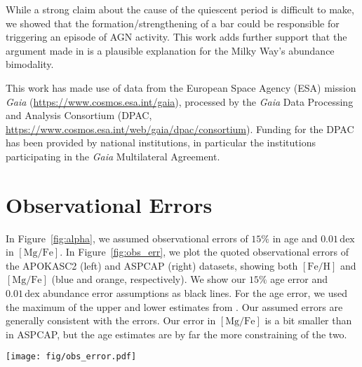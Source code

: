 \documentclass[linenumbers, twocolumn]{aastex631}
\newcommand{\FeH}{\ensuremath{[\textrm{Fe}/\textrm{H}]}}
\newcommand{\MgFe}{\ensuremath{[\textrm{Mg}/\textrm{Fe}]}}
\newcommand{\dex}{\ensuremath{\textrm{dex}}}
\begin{document}
While a strong claim about the cause of the quiescent period is difficult to make, we showed that the formation/strengthening of a bar could be responsible for triggering an episode of AGN activity. This work adds further support that the argument made in \citet{2024arXiv240707985B} is a plausible explanation for the Milky Way's abundance bimodality.

\begin{acknowledgements}
This work has made use of data from the European Space Agency (ESA) mission {\it Gaia} (\url{https://www.cosmos.esa.int/gaia}), processed by the {\it Gaia} Data Processing and Analysis Consortium (DPAC, \url{https://www.cosmos.esa.int/web/gaia/dpac/consortium}). Funding for the DPAC has been provided by national institutions, in particular the institutions participating in the {\it Gaia} Multilateral Agreement.
\end{acknowledgements}

{}


\appendix

\section{Observational Errors}\label{app:obs_err}
In Figure~\ref{fig:alpha}, we assumed observational errors of $15\%$ in age and $0.01\,\dex$ in \MgFe{}. In Figure~\ref{fig:obs_err}, we plot the quoted observational errors of the APOKASC2 (left) and ASPCAP (right) datasets, showing both \FeH{} and \MgFe{} (blue and orange, respectively). We show our $15\%$ age error and $0.01\,\dex$ abundance error assumptions as black lines. For the age error, we used the maximum of the upper and lower estimates from \citet{2018ApJS..239...32P}. Our assumed errors are generally consistent with the errors. Our error in \MgFe{} is a bit smaller than in ASPCAP, but the age estimates are by far the more constraining of the two.

\begin{figure*}
  \centering
  \texttt{[image: fig/obs\_error.pdf]}
  \caption{The observational errors of the APOKASC2 (left) and ASPCAP dataset (right). We show, on the left, a line indicating a $15\%$ error in observed age and on the right a vertical line indicating a $0.01\,\dex$ error.}
  \label{fig:obs_err}
\end{figure*}
\end{document}
